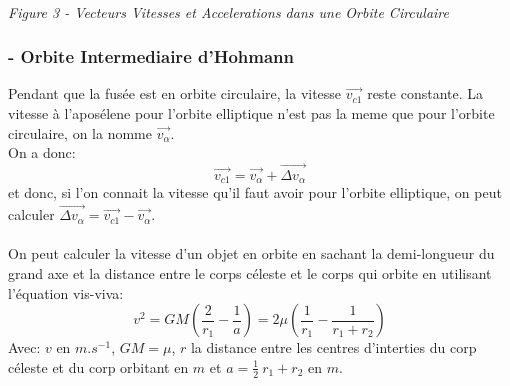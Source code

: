 \documentclass[a4paper, 12pt]{scrartcl}
\begin{document}
\begin{center}
    \\
    \vspace{5mm}
    \emph{Figure 3 - Vecteurs Vitesses et Accelerations dans une Orbite Circulaire}
\end{center}
\subsubsection{- Orbite Intermediaire d'Hohmann}
Pendant que la fusée est en orbite circulaire, la vitesse $\overrightarrow{v_{c1}}$ reste constante. La vitesse à l'aposélene pour l'orbite elliptique n'est pas la meme que pour 
l'orbite circulaire, on la nomme $\overrightarrow{v_\alpha}$. 
\\
On a donc:
\[ \overrightarrow{v_{c1}} = \overrightarrow{v_\alpha} + \overrightarrow{\Delta v_{\alpha}}\]
et donc, si l'on connait la vitesse qu'il faut avoir pour l'orbite elliptique, on peut calculer $\overrightarrow{\Delta v_{\alpha}} = \overrightarrow{v_{c1}} - \overrightarrow{v_\alpha}$.
\\ \\ 
On peut calculer la vitesse d'un objet en orbite en sachant la demi-longueur du grand axe et la distance entre le corps céleste et le corps qui orbite en utilisant
l'équation vis-viva:
\[ v^2 = GM(\frac{2}{r_1}-\frac{1}{a}) = 2\mu (\frac{1}{r_1}-\frac{1}{r_1+r_2}) \]
Avec: $v \text{ en } \si{m.s^{-1}}$, $ GM = \mu$, $r$ la distance entre les centres d'interties du corp céleste et du corp orbitant en $\si{m}$ et $a = \frac{1}{2}\ r_1+r_2 \text{ en } \si{m}$.
\\
\end{document}
